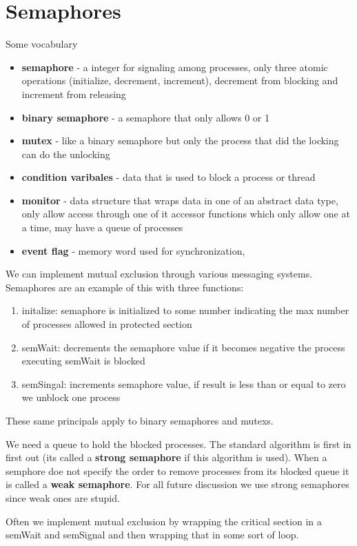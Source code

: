 \documentclass[12pt]{article}
\begin{document}
\section{Semaphores}
Some vocabulary
\begin{itemize}
    \item \textbf{semaphore} - a integer for signaling among processes, only three atomic operations (initialize, decrement, increment), decrement from blocking and increment from releasing
    \item \textbf{binary semaphore} - a semaphore that only allows 0 or 1
    \item \textbf{mutex} - like a binary semaphore but only the process that did the locking can do the unlocking
    \item \textbf{condition varibales} - data that is used to block a process or thread
    \item \textbf{monitor} - data structure that wraps data in one of an abstract data type, only allow access through one of it accessor functions which only allow one at a time, may have a queue of processes
    \item \textbf{event flag} - memory word used for synchronization,
\end{itemize}

We can implement mutual exclusion through various messaging systems. Semaphores are an example of this with three functions:
\begin{enumerate}
     \item initalize: semaphore is initialized to some number indicating the max number of processes allowed in protected section
    \item semWait: decrements the semaphore value if it becomes negative the process executing semWait is blocked
    \item semSingal: increments semaphore value, if result is less than or equal to zero we unblock one process
\end{enumerate}

These same principals apply to binary semaphores and mutexs.

We need a queue to hold the blocked processes. The standard algorithm is first in first out (its called a \textbf{strong semaphore} if this algorithm is used). When a semphore doe not specify the order to remove processes from its blocked queue it is called a \textbf{weak semaphore}. For all future discussion we use strong semaphores since weak ones are stupid.

Often we implement mutual exclusion by wrapping the critical section in a semWait and semSignal and then wrapping that in some sort of loop.
\end{document}
